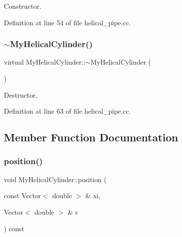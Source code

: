 Constructor. 



Definition at line 54 of file helical\+\_\+pipe.\+cc.

\mbox{\label{classMyHelicalCylinder_aa93f7a69d2fabd3fedb804ab4ba65946}} 
\subsubsection{\texorpdfstring{$\sim$\+My\+Helical\+Cylinder()}{~MyHelicalCylinder()}}
{\footnotesize\ttfamily virtual My\+Helical\+Cylinder\+::$\sim$\+My\+Helical\+Cylinder (\begin{DoxyParamCaption}{ }\end{DoxyParamCaption})\hspace{0.3cm}{\ttfamily [inline]}}



Destructor. 



Definition at line 63 of file helical\+\_\+pipe.\+cc.



\subsection{Member Function Documentation}
\mbox{\label{classMyHelicalCylinder_aaf3a0e41ba30cd66d049a3fcb8eb1213}} 
\subsubsection{\texorpdfstring{position()}{position()}\hspace{0.1cm}{\footnotesize\ttfamily [1/2]}}
{\footnotesize\ttfamily void My\+Helical\+Cylinder\+::position (\begin{DoxyParamCaption}\item[{const Vector$<$ double $>$ \&}]{xi,  }\item[{Vector$<$ double $>$ \&}]{r }\end{DoxyParamCaption}) const\hspace{0.3cm}{\ttfamily [inline]}}



